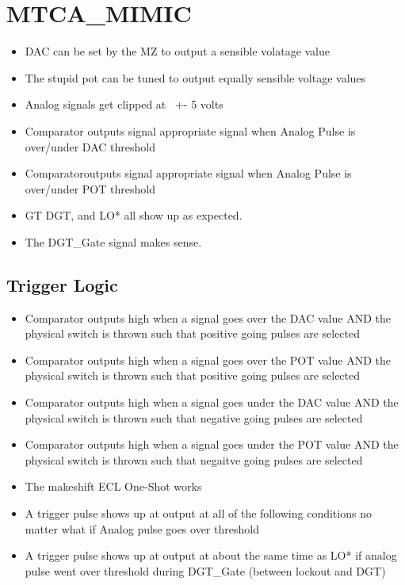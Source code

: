 \documentclass[11pt,a4paper]{article}
\begin{document}
\section{MTCA\_MIMIC}
\begin{itemize}
\item DAC can be set by the MZ to output a sensible volatage value
\item The stupid pot can be tuned to output equally sensible voltage values
\item Analog signals get clipped at ~+- 5 volts
\item Comparator outputs signal appropriate signal when Analog Pulse is over/under
 DAC threshold
 \item Comparatoroutputs signal appropriate signal when Analog Pulse is over/under
 POT threshold


\item GT DGT, and LO* all show up as expected.
\item The DGT\_Gate signal makes sense.
\end{itemize}
\subsection{Trigger Logic}
\begin{itemize}


\item Comparator outputs high when a signal goes over the DAC value AND the 
physical switch is thrown such that positive going pulses are selected

\item Comparator outputs high when a signal goes over the POT value AND the 
physical switch is thrown such that positive going pulses are selected

\item Comparator outputs high when a signal goes under the DAC value AND the 
physical switch is thrown such that negative going pulses are selected

\item Comparator outputs high when a signal goes under the POT value AND the 
physical switch is thrown such that negaitve going pulses are selected

\item The makeshift ECL One-Shot works

\item A trigger pulse shows up at output at all of the following conditions
no matter what if Analog pulse goes over threshold

\item A trigger pulse shows up at output at about the same time as LO* if analog
pulse went over threshold during DGT\_Gate (between lockout and DGT)


\end{itemize}
\end{document}
